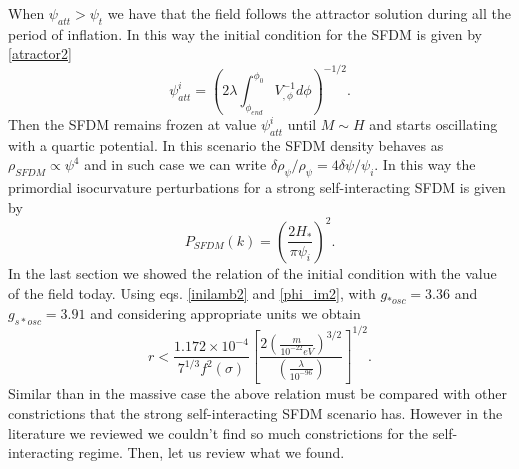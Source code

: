 \documentclass[amssymb,twocolumn,prd,nofootinbib,showpacs]{revtex4-1}
\begin{document}
When $\psi_{att}>\psi_t$ we have that the field follows the attractor solution during all the period of inflation. 
In this way the initial condition for the SFDM is given by \eqref{atractor2}
%
\begin{equation}\label{atractor3}
\psi_{att}^i = \left(2\lambda\int_{\phi_{end}}^{\phi_0}V^{-1}_{,\phi}d\phi\right)^{-1/2}.
\end{equation}
%
Then the SFDM remains frozen at value $\psi_{att}^i$ until $M\sim H$ and starts oscillating with a 
quartic potential. In this scenario the SFDM density behaves as $\rho_{SFDM}\propto \psi^4$ and 
in such case we can write $\delta\rho_{\psi}/\rho_\psi=4\delta\psi/\psi_i$. In this way the primordial 
isocurvature perturbations for a strong self-interacting SFDM is given by
%
\begin{equation}
P_{SFDM}(k)=\left(\frac{2H_*}{\pi\psi_i}\right)^2.
\end{equation}
%
In the last section we showed the relation of the initial condition  with the value of the 
field today. Using eqs. \eqref{inilamb2} and \eqref{phi_im2}, 
with $g_{*osc}=3.36$ and $g_{s*osc}=3.91$  and considering appropriate units we obtain
%
\begin{equation}\label{constr4}
r<\frac{1.172\times 10^{-4}}{7^{1/3}f^2(\sigma)}\left[\frac{2
\left(\frac{m}{10^{-22}eV}\right)^{3/2}}{\left(\frac{\lambda}{10^{-96}}\right)}\right]^{1/2}.
\end{equation}
%
Similar than in the massive case the above relation must be compared with other constrictions that the strong self-interacting SFDM scenario has. However in the literature we reviewed we couldn't find so much constrictions for the self-interacting regime. Then, let us review what we found. 
\end{document}
